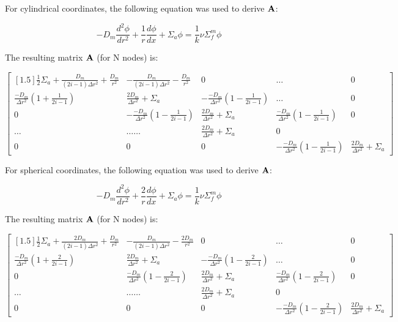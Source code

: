 \documentclass[../main.tex]{subfiles}
\begin{document}
For cylindrical coordinates, the following equation was used to derive $\mathbf{A}$:

\begin{equation*}
		-D_m \frac{d^2 \phi}{d r^2} + \frac{1}{r} \frac{d \phi}{dx} + \Sigma_a \phi =   \frac{1}{k} \nu \Sigma^m_f \phi
	\end{equation*}
	
The resulting matrix $\mathbf{A}$ (for N nodes) is:

\[
	\begin{bmatrix}[1.5]
		\frac{1}{2} \Sigma_a + \frac{D_m}{(2i-1)\Delta r^2} +\frac{D_m}{r^2} & -\frac{D_m}{(2i-1)\Delta r^2} - \frac{D_m}{r^2} & 0 & \dots & 0 \\
		\frac{-D_m}{\Delta r^2} \left( 1 + \frac{1}{2i-1} \right) & \frac{2D_m}{\Delta r^2} + \Sigma_a & - \frac{-D_m}{\Delta r^2} \left( 1 - \frac{1}{2i-1} \right) & \dots & 0 \\
		0 & - \frac{-D_m}{\Delta r^2} \left( 1 - \frac{1}{2i-1} \right) & \frac{2D_m}{\Delta r^2} + \Sigma_a & \frac{-D_m}{\Delta r^2} \left( 1 - \frac{1}{2i-1} \right) & 0\\
		\dots & \dots \dots & \frac{2D_m}{\Delta r^2} + \Sigma_a & 0 \\
		0 & 0 & 0 & -\frac{-D_m}{\Delta r^2} \left( 1 - \frac{1}{2i-1} \right) & \frac{2D_m}{\Delta r^2} + \Sigma_a
	\end{bmatrix}
	\]

For spherical coordinates, the following equation was used to derive $\mathbf{A}$:

\begin{equation*}
		-D_m \frac{d^2 \phi}{d r^2} + \frac{2}{r} \frac{d \phi}{dx} + \Sigma_a \phi =   \frac{1}{k} \nu \Sigma^m_f \phi
	\end{equation*}

The resulting matrix $\mathbf{A}$ (for N nodes) is:

\[
	\begin{bmatrix}[1.5]
		\frac{1}{2} \Sigma_a + \frac{2 D_m}{(2i-1)\Delta r^2} +\frac{D_m}{r^2} & -\frac{D_m}{(2i-1)\Delta r^2} - \frac{2 D_m}{r^2} & 0 & \dots & 0 \\
		\frac{-D_m}{\Delta r^2} \left( 1 + \frac{2}{2i-1} \right) & \frac{2D_m}{\Delta r^2} + \Sigma_a & - \frac{-D_m}{\Delta r^2} \left( 1 - \frac{2}{2i-1} \right) & \dots & 0 \\
		0 & \frac{-D_m}{\Delta r^2} \left( 1 - \frac{2}{2i-1} \right) & \frac{2D_m}{\Delta r^2} + \Sigma_a & \frac{-D_m}{\Delta r^2} \left( 1 - \frac{2}{2i-1} \right) & 0\\
		\dots & \dots \dots & \frac{2D_m}{\Delta r^2} + \Sigma_a & 0 \\
		0 & 0 & 0 & -\frac{-D_m}{\Delta r^2} \left( 1 - \frac{2}{2i-1} \right) & \frac{2D_m}{\Delta r^2} + \Sigma_a
	\end{bmatrix}
	\]
\end{document}
